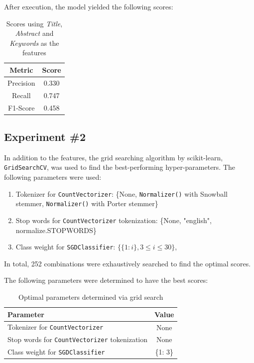 \documentclass[11pt]{article}
\begin{document}
After execution, the model yielded the following scores:
\begin{table}[!ht]
    \caption{Scores using \textit{Title}, \textit{Abstract} and \textit{Keywords} as the features}
    \begin{center}

        \begin{tabular}{| c | c |}
        \hline
        \textbf{Metric} & \textbf{Score}
        \\ \hline
        Precision & 0.330 
        \\ \hline
        Recall & 0.747
        \\ \hline
        F1-Score & 0.458
        \\ \hline
        \end{tabular}

    \end{center}

\end{table}

\subsection*{Experiment \#2}
In addition to the features, the grid searching algorithm by scikit-learn, \texttt{GridSearchCV}, was used to find the best-performing hyper-parameters. The following parameters were used:
\begin{enumerate}
    \item Tokenizer for \texttt{CountVectorizer}: \{None, \texttt{Normalizer()} with Snowball stemmer, \texttt{Normalizer()} with Porter stemmer\}
    \item Stop words for \texttt{CountVectorizer} tokenization: \{None, "english", normalize.STOPWORDS\}
    \item Class weight for \texttt{SGDClassifier}: $\{\{1: i\}, 3 \le i \le 30\}$,
\end{enumerate}
In total, 252 combinations were exhaustively searched to find the optimal scores.

The following parameters were determined to have the best scores:
\begin{table}[!ht]
    \caption{Optimal parameters determined via grid search}
    \begin{center}

        \begin{tabular}{| l | c |}
        \hline
        \textbf{Parameter} & \textbf{Value}
        \\ \hline
        Tokenizer for \texttt{CountVectorizer} & None
        \\ \hline
        Stop words for \texttt{CountVectorizer} tokenization & None
        \\ \hline
        Class weight for \texttt{SGDClassifier} & \{1: 3\}
        \\ \hline
        \end{tabular}

    \end{center}

\end{table}
\end{document}
